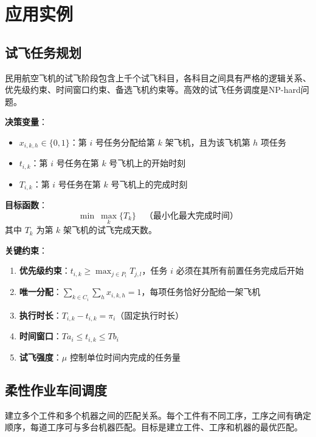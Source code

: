 \section{应用实例}\label{sec:applications}

\subsection{试飞任务规划}

\begin{conceptbox}[问题描述]
民用航空飞机的试飞阶段包含上千个试飞科目，各科目之间具有严格的逻辑关系、优先级约束、时间窗口约束、备选飞机约束等。高效的试飞任务调度是NP-hard问题。
\end{conceptbox}

\textbf{决策变量}：
\begin{itemize}
    \item $x_{i,k,h} \in \{0, 1\}$：第 $i$ 号任务分配给第 $k$ 架飞机，且为该飞机第 $h$ 项任务
    \item $t_{i,k}$：第 $i$ 号任务在第 $k$ 号飞机上的开始时刻
    \item $T_{i,k}$：第 $i$ 号任务在第 $k$ 号飞机上的完成时刻
\end{itemize}

\textbf{目标函数}：
\[
\min\ \max_{k} \{T_k\}\quad \text{（最小化最大完成时间）}
\]
其中 $T_k$ 为第 $k$ 架飞机的试飞完成天数。

\textbf{关键约束}：
\begin{enumerate}[label=(\arabic*)]
    \item \textbf{优先级约束}：$t_{i,k} \geq \max_{j \in P_i} T_{j,l}$，任务 $i$ 必须在其所有前置任务完成后开始
    \item \textbf{唯一分配}：$\sum_{k \in C_i} \sum_h x_{i,k,h} = 1$，每项任务恰好分配给一架飞机
    \item \textbf{执行时长}：$T_{i,k} - t_{i,k} = \pi_i$（固定执行时长）
    \item \textbf{时间窗口}：$Ta_i \leq t_{i,k} \leq Tb_i$
    \item \textbf{试飞强度}：$\mu$ 控制单位时间内完成的任务量
\end{enumerate}

\subsection{柔性作业车间调度}

\begin{conceptbox}[问题描述]
建立多个工件和多个机器之间的匹配关系。每个工件有不同工序，工序之间有确定顺序，每道工序可与多台机器匹配。目标是建立工件、工序和机器的最优匹配。
\end{conceptbox}

